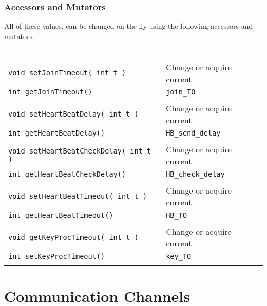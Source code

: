 \documentclass[12pt]{article}
\newcommand{\code}[1]{\texttt{#1}}
\begin{document}
       \subsubsection{Accessors and Mutators}
     All of these values, can be changed on the fly using the following 
     accessors and mutators. \\\\
       \begin{tabular} {ll}
	   \code{void setJoinTimeout( int t )}
	     & Change or acquire current \\
	   \code{int \hspace{.1in}getJoinTimeout()}
	     & \hspace{.3in}\code{join\_TO} \\\\
	   \code{void setHeartBeatDelay( int t )}
	     & Change or acquire current \\
	   \code{int \hspace{.1in}getHeartBeatDelay()}
	     & \hspace{.3in}\code{HB\_send\_delay}\\\\
	   \code{void setHeartBeatCheckDelay( int t )}
	     & Change or acquire current \\
	   \code{int \hspace{.1in}getHeartBeatCheckDelay()}
	     & \hspace{.3in}\code{HB\_check\_delay}\\\\
	   \code{void setHeartBeatTimeout( int t )}
	     & Change or acquire current \\
	   \code{int \hspace{.1in}getHeartBeatTimeout()}
	     & \hspace{.3in}\code{HB\_TO} \\\\
	   \code{void getKeyProcTimeout( int t )}
	     & Change or acquire current \\
	   \code{int \hspace{.1in}setKeyProcTimeout()}
	     & \hspace{.3in}\code{key\_TO} \\\\
       \end{tabular}

    \section{Communication Channels}
    \label{xref:communication_channels}
\end{document}
